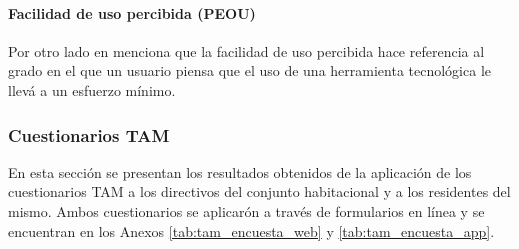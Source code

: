 \paragraph{Facilidad de uso percibida (PEOU)}
Por otro lado en \cite{tapia_leon_comparacion_2015} menciona que la facilidad de uso percibida hace referencia al grado en el que un usuario piensa que el uso de una herramienta tecnológica le llevá a un esfuerzo mínimo.

\subsubsection{Cuestionarios TAM}\label{subsubsec:cuestionarios-tam}
En esta sección se presentan los resultados obtenidos de la aplicación de los cuestionarios TAM a los directivos del conjunto habitacional y a los residentes del mismo.
Ambos cuestionarios se aplicarón a través de formularios en línea y se encuentran en los Anexos \ref{tab:tam_encuesta_web} y \ref{tab:tam_encuesta_app}.

